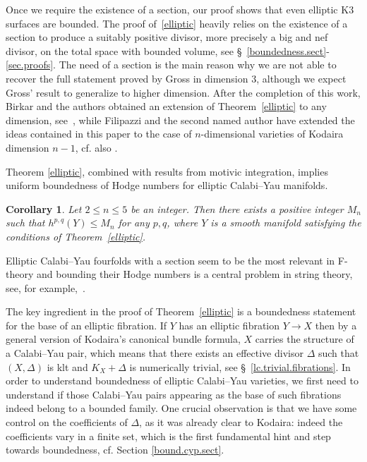 \documentclass{amsart}[12pt,a4paper]
\newtheorem{corollary}[theorem]{Corollary}
\theoremstyle{definition}
\begin{document}
Once we require the existence of a section, our proof shows that even elliptic K3 surfaces are bounded.
The proof of~\ref{elliptic} heavily relies on the existence of a section to produce a suitably positive divisor, more precisely a big and nef divisor, on the total space with bounded volume, see \S~\ref{boundedness.sect}-\ref{sec.proofs}. 
The need of a section is the main reason why we are not able to recover the full statement proved by Gross in dimension $3$, although we expect Gross' result to generalize to higher dimension.
After the completion of this work, Birkar and the authors obtained an extension of Theorem~\ref{elliptic} to any dimension, see~\cite{bds}, while Filipazzi and the second named author \cite{FS20} have extended the ideas contained in this paper to the case of $n$-dimensional varieties of Kodaira dimension $n-1$, cf. also \cite{Fil20}.
 
Theorem \ref{elliptic}, combined with results from motivic integration, implies uniform boundedness of Hodge numbers for elliptic Calabi--Yau manifolds. 

\begin{corollary}
\label{hodge}
Let $2 \leq n\leq 5$ be an integer. 
Then there exists a positive integer $M_n$ such that $h^{p,q}(Y)\leq M_n$ for any $p,q$, where $Y$ is a  smooth manifold satisfying the conditions of Theorem~\ref{elliptic}.
\end{corollary}

Elliptic Calabi--Yau fourfolds with a section seem to be the most relevant in F-theory and bounding their Hodge numbers is a central problem in string theory, see, for example,~\cite{TW}. 
 
The key ingredient in the proof of Theorem~\ref{elliptic} is a boundedness statement for the base of an elliptic fibration. 
If $Y$ has an elliptic fibration $Y \rightarrow X$ then by a general version of Kodaira's canonical bundle formula, $X$ carries the structure of a Calabi--Yau pair, which means that there exists an effective divisor $\Delta$ such that $(X,\Delta)$ is klt and  $K_X +\Delta$ is numerically trivial, see \S~\ref{lc.trivial.fibrations}.
In order to understand boundedness of elliptic Calabi--Yau varieties, we first need to understand if those Calabi--Yau pairs appearing as the base of such fibrations indeed belong to a bounded family. 
One crucial observation is that we have some control on the coefficients of $\Delta$, as it was already clear to Kodaira: indeed the coefficients vary in a finite set, which is the first fundamental hint and step towards boundedness, cf. Section \ref{bound.cyp.sect}.
\end{document}

